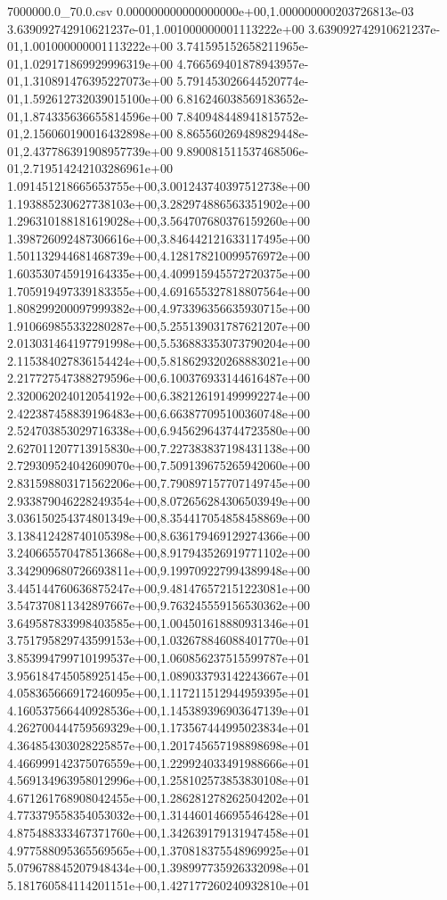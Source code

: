 \begin{filecontents*}{7000000.0_70.0.csv}
0.000000000000000000e+00,1.000000000203726813e-03
3.639092742910621237e-01,1.001000000001113222e+00
3.639092742910621237e-01,1.001000000001113222e+00
3.741595152658211965e-01,1.029171869929996319e+00
4.766569401878943957e-01,1.310891476395227073e+00
5.791453026644520774e-01,1.592612732039015100e+00
6.816246038569183652e-01,1.874335636655814596e+00
7.840948448941815752e-01,2.156060190016432898e+00
8.865560269489829448e-01,2.437786391908957739e+00
9.890081511537468506e-01,2.719514242103286961e+00
1.091451218665653755e+00,3.001243740397512738e+00
1.193885230627738103e+00,3.282974886563351902e+00
1.296310188181619028e+00,3.564707680376159260e+00
1.398726092487306616e+00,3.846442121633117495e+00
1.501132944681468739e+00,4.128178210099576972e+00
1.603530745919164335e+00,4.409915945572720375e+00
1.705919497339183355e+00,4.691655327818807564e+00
1.808299200097999382e+00,4.973396356635930715e+00
1.910669855332280287e+00,5.255139031787621207e+00
2.013031464197791998e+00,5.536883353073790204e+00
2.115384027836154424e+00,5.818629320268883021e+00
2.217727547388279596e+00,6.100376933144616487e+00
2.320062024012054192e+00,6.382126191499992274e+00
2.422387458839196483e+00,6.663877095100360748e+00
2.524703853029716338e+00,6.945629643744723580e+00
2.627011207713915830e+00,7.227383837198431138e+00
2.729309524042609070e+00,7.509139675265942060e+00
2.831598803171562206e+00,7.790897157707149745e+00
2.933879046228249354e+00,8.072656284306503949e+00
3.036150254374801349e+00,8.354417054858458869e+00
3.138412428740105398e+00,8.636179469129274366e+00
3.240665570478513668e+00,8.917943526919771102e+00
3.342909680726693811e+00,9.199709227994389948e+00
3.445144760636875247e+00,9.481476572151223081e+00
3.547370811342897667e+00,9.763245559156530362e+00
3.649587833998403585e+00,1.004501618880931346e+01
3.751795829743599153e+00,1.032678846088401770e+01
3.853994799710199537e+00,1.060856237515599787e+01
3.956184745058925145e+00,1.089033793142243667e+01
4.058365666917246095e+00,1.117211512944959395e+01
4.160537566440928536e+00,1.145389396903647139e+01
4.262700444759569329e+00,1.173567444995023834e+01
4.364854303028225857e+00,1.201745657198898698e+01
4.466999142375076559e+00,1.229924033491988666e+01
4.569134963958012996e+00,1.258102573853830108e+01
4.671261768908042455e+00,1.286281278262504202e+01
4.773379558354053032e+00,1.314460146695546428e+01
4.875488333467371760e+00,1.342639179131947458e+01
4.977588095365569565e+00,1.370818375548969925e+01
5.079678845207948434e+00,1.398997735926332098e+01
5.181760584114201151e+00,1.427177260240932810e+01

\end{filecontents*}
